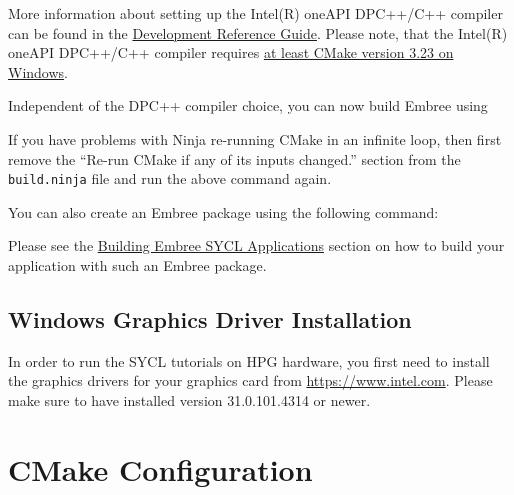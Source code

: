 More information about setting up the Intel(R) oneAPI DPC++/C++ compiler
can be found in the
\href{https://www.intel.com/content/www/us/en/develop/documentation/oneapi-dpcpp-cpp-compiler-dev-guide-and-reference/top/compiler-setup.html}{Development
Reference Guide}. Please note, that the Intel(R) oneAPI DPC++/C++
compiler requires
\href{https://www.intel.com/content/www/us/en/develop/documentation/oneapi-dpcpp-cpp-compiler-dev-guide-and-reference/top/compiler-setup/use-the-command-line/use-cmake-with-the-compiler.html}{at
least CMake version 3.23 on Windows}.

Independent of the DPC++ compiler choice, you can now build Embree using

\begin{Shaded}
\begin{Highlighting}[]
\OperatorTok{{-}{-}}
\end{Highlighting}
\end{Shaded}

If you have problems with Ninja re-running CMake in an infinite loop,
then first remove the ``Re-run CMake if any of its inputs changed.''
section from the \texttt{build.ninja} file and run the above command
again.

You can also create an Embree package using the following command:

\begin{Shaded}
\begin{Highlighting}[]
\OperatorTok{{-}{-}}\OperatorTok{{-}{-}}
\end{Highlighting}
\end{Shaded}

Please see the \hyperref[building-embree-sycl-applications]{Building
Embree SYCL Applications} section on how to build your application with
such an Embree package.

\subsection{Windows Graphics Driver
Installation}\label{windows-graphics-driver-installation}

In order to run the SYCL tutorials on HPG hardware, you first need to
install the graphics drivers for your graphics card from
\url{https://www.intel.com}. Please make sure to have installed version
31.0.101.4314 or newer.

\section{CMake Configuration}\label{cmake-configuration}

